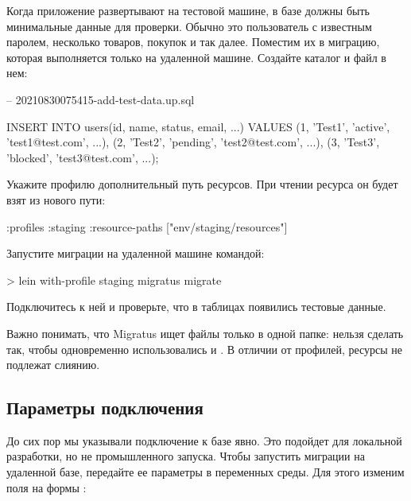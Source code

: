 Когда приложение развертывают на тестовой машине, в базе должны быть минимальные данные для проверки. Обычно это пользователь с известным паролем, несколько товаров, покупок и так далее. Поместим их в миграцию, которая выполняется только на удаленной машине. Создайте каталог  и файл в нем:

\begin{english}
  \begin{sql}
-- 20210830075415-add-test-data.up.sql

INSERT INTO users(id, name, status, email, ...)
VALUES
 (1, 'Test1', 'active',  'test1@test.com', ...),
 (2, 'Test2', 'pending', 'test2@test.com', ...),
 (3, 'Test3', 'blocked', 'test3@test.com', ...);
  \end{sql}
\end{english}

Укажите профилю  дополнительный путь ресурсов. При чтении ресурса  он будет взят из нового пути:

\begin{english}
  \begin{clojure}
{:profiles
 {:staging
  {:resource-paths ["env/staging/resources"]}}}
  \end{clojure}
\end{english}

Запустите миграции на удаленной машине командой:

\begin{english}
  \begin{bash}
> lein with-profile staging migratus migrate
  \end{bash}
\end{english}

Подключитесь к ней и проверьте, что в таблицах появились тестовые данные.

Важно понимать, что Migratus ищет файлы только в одной папке: нельзя сделать так, чтобы одновременно использовались  и . В отличии от профилей, ресурсы не подлежат слиянию.

\subsection{Параметры подключения}

До сих пор мы указывали подключение к базе явно. Это подойдет для локальной разработки, но не промышленного запуска. Чтобы запустить миграции на удаленной базе, передайте ее параметры в переменных среды. Для этого изменим поля  на формы :


